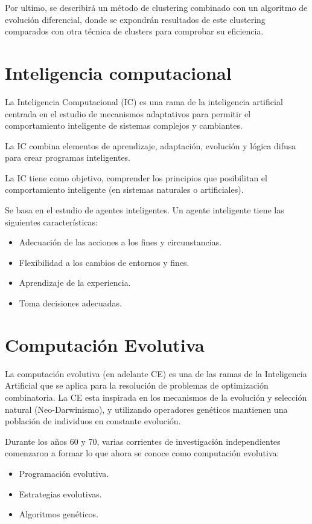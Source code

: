 \documentclass[
]{article}
\begin{document}
Por ultimo, se describirá un método de clustering combinado con un algoritmo de evolución diferencial, donde se expondrán resultados de este clustering comparados con otra técnica de clusters para comprobar su eficiencia.

\newpage

\section{Inteligencia computacional}
La Inteligencia Computacional (IC) es una rama de la inteligencia artificial centrada en el estudio de mecanismos adaptativos para permitir el comportamiento inteligente de sistemas complejos y cambiantes.

La IC combina elementos de aprendizaje, adaptación, evolución y lógica difusa para crear programas inteligentes.

La IC tiene como objetivo, comprender los principios que posibilitan el comportamiento inteligente (en sistemas naturales o artificiales).

Se basa en el estudio de agentes inteligentes. Un agente inteligente tiene las siguientes características:
\begin{itemize}
	\item Adecuación de las acciones a los fines y circunstancias.
	\item Flexibilidad a los cambios de entornos y fines.
	\item Aprendizaje de la experiencia.
	\item Toma decisiones adecuadas.
\end{itemize} 

\section{Computación Evolutiva}
La computación evolutiva (en adelante CE) es una de las ramas de la Inteligencia Artificial que se aplica para la resolución de problemas de optimización combinatoria. La CE esta inspirada en los mecanismos de la evolución y selección natural (Neo-Darwinismo), y utilizando operadores genéticos mantienen una población de individuos en constante evolución.

Durante los años 60 y 70, varias corrientes de investigación independientes comenzaron a formar lo que ahora se conoce como computación evolutiva:
\begin{itemize}
	\item Programación evolutiva.
	\item Estrategias evolutivas.
	\item Algoritmos genéticos.
\end{itemize} 
\end{document}
